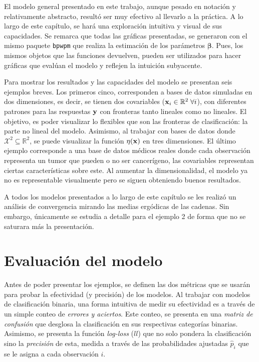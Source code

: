 \documentclass[../Main/Main.tex]{subfiles}
\begin{document}
El modelo general presentado en este trabajo, aunque pesado en notación y relativamente abstracto, resultó ser muy efectivo al llevarlo a la práctica. A lo largo de este capítulo, se hará una exploración intuitiva y visual de sus capacidades. Se remarca que todas las gráficas presentadas, se generaron con el mismo paquete \verb|bpwpm| que realiza la estimación de los parámetros $\bm{\beta}$. Pues, los mismos objetos que las funciones devuelven, pueden ser utilizados para hacer gráficas que evalúan el modelo y reflejen la intuición subyacente. 

Para mostrar los resultados y las capacidades del modelo se presentan seis ejemplos breves. Los primeros cinco, corresponden a bases de datos simuladas en dos dimensiones, es decir, se tienen dos covariables ($\mathbf{x}_i\in\mathbb{R}^2 \;\forall i$),  con diferentes patrones para las respuestas $\mathbf{y}$ con fronteras tanto lineales como no lineales. El objetivo, es poder visualizar lo flexibles que son las fronteras de clasificación: la parte no lineal del modelo. Asimismo, al trabajar con bases de datos donde $\mathcal{X}^2\subseteq\mathbb{R}^2$, se puede visualizar la función $\eta(\mathbf{x})$ en tres dimensiones. El último ejemplo corresponde a una base de datos médicos reales donde cada observación representa un tumor que pueden o no ser cancerígeno, las covariables representan ciertas características sobre este. Al aumentar la dimensionalidad, el modelo ya no es representable visualmente pero se siguen obteniendo buenos resultados.

A todos los modelos presentados a lo largo de este capítulo se les realizó un análisis de convergencia mirando las medias ergódicas de las cadenas. Sin embargo, únicamente se estudia a detalle para el ejemplo 2 de forma que no se saturara más la presentación. %

\section{Evaluación del modelo}
Antes de poder presentar los ejemplos, se definen las dos métricas que se usarán para probar la efectividad (y precisión) de los modelos. Al trabajar con modelos de clasificación binaria, una forma intuitiva de medir su efectividad es a través de un simple conteo de \textit{errores y aciertos}. Este conteo, se presenta en una \textit{matriz de confusión} que desglosa la clasificación en sus respectivas categorías binarias. Asimismo, se presenta la función \textit{log-loss} ($ll$) que no solo pondera la clasificación sino la \textit{precisión} de esta, medida a través de las probabilidades ajustadas $\hat{p}_i$ que se le asigna a cada observación $i$.
\end{document}
